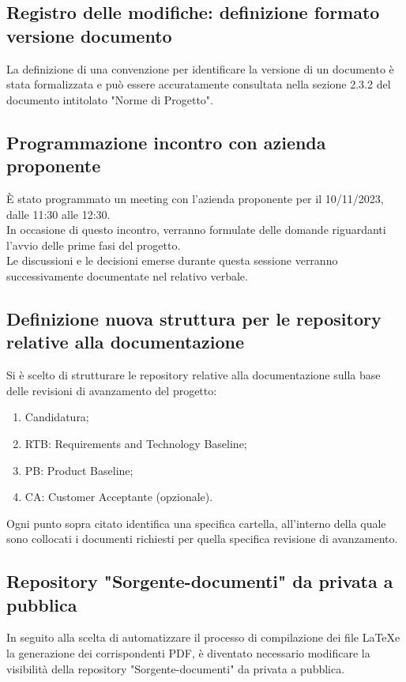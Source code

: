 \documentclass{article}
\begin{document}
    \subsection{Registro delle modifiche: definizione formato versione documento}
    La definizione di una convenzione per identificare la versione di un documento è stata formalizzata e può essere accuratamente consultata nella sezione 2.3.2 del documento intitolato "Norme di Progetto".  

    \subsection{Programmazione incontro con azienda proponente}
        È stato programmato un meeting con l'azienda proponente per il 10/11/2023, dalle 11:30 alle 12:30.\\
        In occasione di questo incontro, verranno formulate delle domande riguardanti l'avvio delle prime fasi del progetto.\\
        Le discussioni e le decisioni emerse durante questa sessione verranno successivamente documentate nel relativo verbale.      
    
    \subsection{Definizione nuova struttura per le repository relative alla documentazione}
        Si è scelto di strutturare le repository relative alla documentazione sulla base delle revisioni di avanzamento del progetto:  
        \begin{enumerate}
            \item Candidatura;
            \item RTB: Requirements and Technology Baseline;
            \item PB: Product Baseline;
            \item CA: Customer Acceptante (opzionale).
        \end{enumerate}
        Ogni punto sopra citato identifica una specifica cartella, all'interno della quale sono collocati i documenti richiesti per quella specifica revisione di avanzamento.

    \subsection{Repository "Sorgente-documenti" da privata a pubblica}
        In seguito alla scelta di automatizzare il processo di compilazione dei file \LaTeX e la generazione dei corrispondenti PDF, è diventato necessario modificare la visibilità della repository "Sorgente-documenti" da privata a pubblica.  
\end{document}
